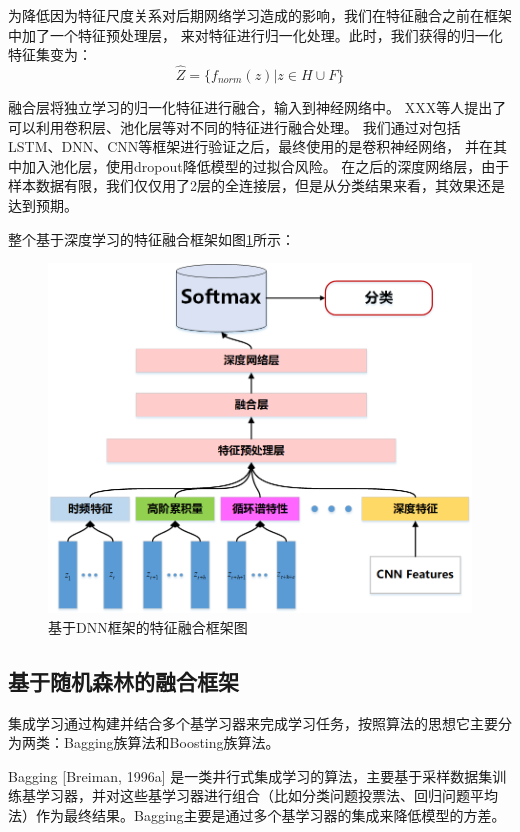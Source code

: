 为降低因为特征尺度关系对后期网络学习造成的影响，我们在特征融合之前在框架中加了一个特征预处理层，
来对特征进行归一化处理。此时，我们获得的归一化特征集变为：
\begin{equation}
	\hat{Z} =\{ f_{norm}(z) | z \in H \cup F \}
\end{equation}

融合层将独立学习的归一化特征进行融合，输入到神经网络中。
XXX等人提出了可以利用卷积层、池化层等对不同的特征进行融合处理。
我们通过对包括LSTM、DNN、CNN等框架进行验证之后，最终使用的是卷积神经网络，
并在其中加入池化层，使用dropout降低模型的过拟合风险。
在之后的深度网络层，由于样本数据有限，我们仅仅用了2层的全连接层，但是从分类结果来看，其效果还是达到预期。\par


整个基于深度学习的特征融合框架如图\ref{sec:fig_4_3}所示：
\begin{figure}[!h]
	\centering
	\includegraphics[scale=0.6]{figures/chapter_4/DL_combine}
	\caption{基于DNN框架的特征融合框架图}\label{sec:fig_4_3}
\end{figure}


\subsection{基于随机森林的融合框架}
集成学习通过构建并结合多个基学习器来完成学习任务，按照算法的思想它主要分为两类：Bagging族算法和Boosting族算法。\par

Bagging [Breiman, 1996a] 是一类井行式集成学习的算法，主要基于采样数据集训练基学习器，并对这些基学习器进行组合（比如分类问题投票法、回归问题平均法）作为最终结果。Bagging主要是通过多个基学习器的集成来降低模型的方差。

